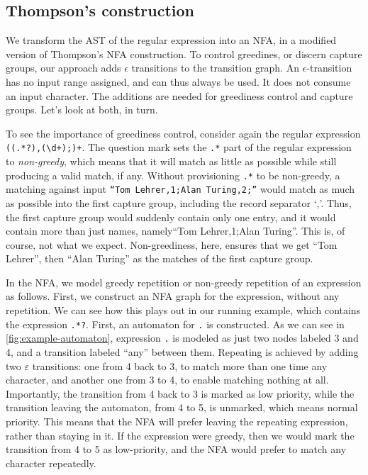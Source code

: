 \documentclass[english]{sigplanconf}
\theoremstyle{definition}
\begin{document}
\subsection{Thompson's construction} 

We transform the AST of the regular expression into an NFA,
in a modified version of Thompson's NFA construction. To
control greedines, or discern capture groups, our approach adds
$\epsilon$ transitions to the transition graph. An
$\epsilon$-transition has no input range assigned, and can thus always
be used. It does not consume an input character.
The additions are needed for greediness control and capture groups.
Let's look at both, in turn.

To see the importance of greediness control, consider again the regular
expression \texttt{((.*?),(\textbackslash{}d+);)+}. The question
mark sets the \texttt{.*} part of the regular expression to
\emph{non-greedy}, which means that it will match as little as
possible while still producing a valid match, if any.  Without
provisioning \texttt{.*} to be non-greedy, a matching against input
\texttt{``Tom Lehrer,1;Alan Turing,2;''} would match as much as
possible into the first capture group, including the record separator
`,'.  Thus, the first capture group would suddenly contain only one
entry, and it would contain more than just names, namely``Tom
Lehrer,1;Alan Turing''.  This is, of course, not what we expect.
Non-greediness, here, ensures that we get ``Tom Lehrer'', then
``Alan Turing'' as the matches of the first capture group.

In the NFA, we model greedy repetition or non-greedy repetition of
an expression as follows.  First, we construct an NFA graph for the
expression, without any repetition.  We can see how this plays out
in our running example, which contains the expression \texttt{.*?}.
First, an automaton for \texttt{.} is constructed.  As we can see
in \autoref{fig:example-automaton}, expression \texttt{.} is modeled as
just two nodes labeled 3 and 4, and a transition labeled ``any''
between them.  Repeating is achieved by adding two $\varepsilon$
transitions: one from 4 back to 3, to match more than one time any
character, and another one from 3 to 4, to enable matching nothing
at all.  Importantly, the transition from 4 back to 3 is marked as
low priority, while the transition leaving the automaton, from 4
to 5, is unmarked, which means normal priority.  This means that
the NFA will prefer leaving the repeating expression, rather than
staying in it.  If the expression were greedy, then we would mark
the transition from 4 to 5 as low-priority, and the NFA would prefer
to match any character repeatedly.
\end{document}
